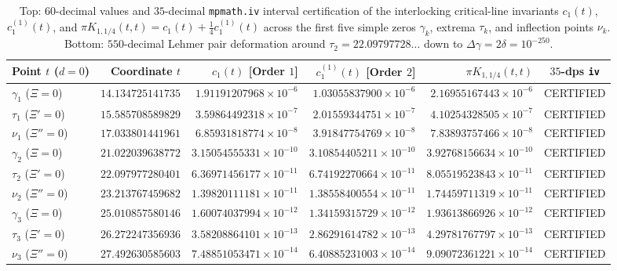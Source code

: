 \documentclass[11pt,reqno]{amsart}
\theoremstyle{definition}
\theoremstyle{remark}
\numberwithin{equation}{section}
\begin{document}
\begin{table}[t]
\centering
\caption{Top: $60$-decimal values and $35$-decimal \texttt{mpmath.iv} interval certification of the interlocking critical-line invariants $c_1(t)$, $c_1^{(1)}(t)$, and $\pi K_{1,1/4}(t,t) = c_1(t) + \frac{1}{4}c_1^{(1)}(t)$ across the first five simple zeros $\gamma_k$, extrema $\tau_k$, and inflection points $\nu_k$. Bottom: $550$-decimal Lehmer pair deformation around $\tau_2 = 22.09797728\dots$ down to $\Delta\gamma = 2\delta = 10^{-250}$.}\label{tab:lehmer_interlocking}
\scriptsize
\setlength{\tabcolsep}{3.0pt}
\begin{tabular}{@{}lrrrrc@{}}
\toprule
Point $t$ ($d = 0$) & Coordinate $t$ & $c_1(t)$ [Order $1$] & $c_1^{(1)}(t)$ [Order $2$] & $\pi K_{1,1/4}(t,t)$ & $35$-dps \texttt{iv} \\
\midrule
$\gamma_1$ ($\Xi=0$)   & $14.134725141735$ & $1.91191207968\times 10^{-6}$  & $1.03055837900\times 10^{-6}$  & $2.16955167443\times 10^{-6}$  & CERTIFIED \\
$\tau_1$ ($\Xi'=0$)    & $15.585708589829$ & $3.59864492318\times 10^{-7}$  & $2.01559344751\times 10^{-7}$  & $4.10254328505\times 10^{-7}$  & CERTIFIED \\
$\nu_1$ ($\Xi''=0$)    & $17.033801441961$ & $6.85931818774\times 10^{-8}$  & $3.91847754769\times 10^{-8}$  & $7.83893757466\times 10^{-8}$  & CERTIFIED \\
$\gamma_2$ ($\Xi=0$)   & $21.022039638772$ & $3.15054555331\times 10^{-10}$ & $3.10854405211\times 10^{-10}$ & $3.92768156634\times 10^{-10}$ & CERTIFIED \\
$\tau_2$ ($\Xi'=0$)    & $22.097977280401$ & $6.36971456177\times 10^{-11}$ & $6.74192270664\times 10^{-11}$ & $8.05519523843\times 10^{-11}$ & CERTIFIED \\
$\nu_2$ ($\Xi''=0$)    & $23.213767459682$ & $1.39820111181\times 10^{-11}$ & $1.38558400554\times 10^{-11}$ & $1.74459711319\times 10^{-11}$ & CERTIFIED \\
$\gamma_3$ ($\Xi=0$)   & $25.010857580146$ & $1.60074037994\times 10^{-12}$ & $1.34159315729\times 10^{-12}$ & $1.93613866926\times 10^{-12}$ & CERTIFIED \\
$\tau_3$ ($\Xi'=0$)    & $26.272247356936$ & $3.58208864101\times 10^{-13}$ & $2.86291614782\times 10^{-13}$ & $4.29781767797\times 10^{-13}$ & CERTIFIED \\
$\nu_3$ ($\Xi''=0$)    & $27.492630585603$ & $7.48851053471\times 10^{-14}$ & $6.40885231003\times 10^{-14}$ & $9.09072361221\times 10^{-14}$ & CERTIFIED \\

\end{tabular}
\end{table}
\end{document}
